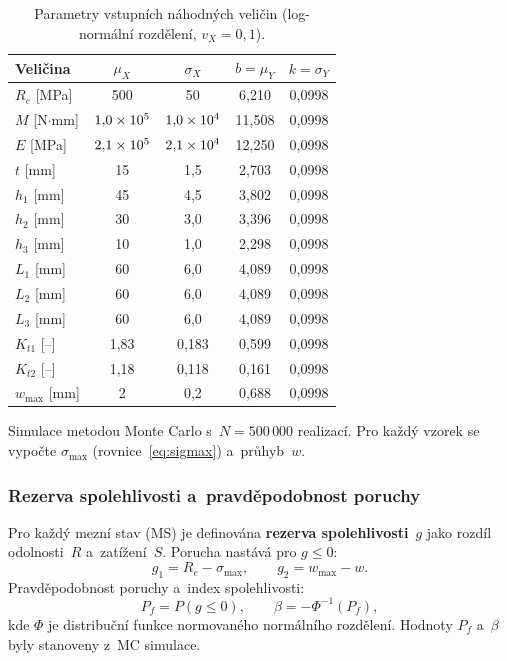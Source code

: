 \begin{table}[H]
\centering
\caption{Parametry vstupních náhodných veličin (log-normální rozdělení, $v_X = 0{,}1$).}
\begin{tabular}{lcccc}
\toprule
\textbf{Veličina} & $\mu_X$ & $\sigma_X$ & $b = \mu_Y$ & $k = \sigma_Y$ \\
\midrule
$R_e$ [MPa]    & 500       & 50      & 6{,}210  & 0{,}0998 \\
$M$ [N$\cdot$mm] & $1{,}0\times 10^{5}$ & $1{,}0\times 10^{4}$ & 11{,}508 & 0{,}0998 \\
$E$ [MPa]      & $2{,}1\times 10^{5}$ & $2{,}1\times 10^{4}$ & 12{,}250 & 0{,}0998 \\
$t$ [mm]       & 15        & 1{,}5   & 2{,}703  & 0{,}0998 \\
$h_1$ [mm]     & 45        & 4{,}5   & 3{,}802  & 0{,}0998 \\
$h_2$ [mm]     & 30        & 3{,}0   & 3{,}396  & 0{,}0998 \\
$h_3$ [mm]     & 10        & 1{,}0   & 2{,}298  & 0{,}0998 \\
$L_1$ [mm]     & 60        & 6{,}0   & 4{,}089  & 0{,}0998 \\
$L_2$ [mm]     & 60        & 6{,}0   & 4{,}089  & 0{,}0998 \\
$L_3$ [mm]     & 60        & 6{,}0   & 4{,}089  & 0{,}0998 \\
$K_{t1}$ [--]  & 1{,}83    & 0{,}183 & 0{,}599  & 0{,}0998 \\
$K_{t2}$ [--]  & 1{,}18    & 0{,}118 & 0{,}161  & 0{,}0998 \\
$w_{\max}$ [mm] & 2        & 0{,}2   & 0{,}688  & 0{,}0998 \\
\bottomrule
\end{tabular}
\end{table}

Simulace metodou Monte Carlo s~$N = 500\,000$ realizací. Pro každý vzorek se vypočte $\sigma_{\max}$ (rovnice~\eqref{eq:sigmax}) a~průhyb~$w$.

\subsubsection{Rezerva spolehlivosti a~pravděpodobnost poruchy}

Pro každý mezní stav (MS) je definována \textbf{rezerva spolehlivosti}~$g$ jako rozdíl odolnosti~$R$ a~zatížení~$S$. Porucha nastává pro $g \le 0$:
\begin{equation}
    g_1 = R_e - \sigma_{\max}, \qquad g_2 = w_{\max} - w.
\end{equation}
Pravděpodobnost poruchy a~index spolehlivosti:
\begin{equation}
    P_f = P(g \le 0), \qquad \beta = -\Phi^{-1}(P_f),
\end{equation}
kde $\Phi$ je distribuční funkce normovaného normálního rozdělení. Hodnoty $P_f$ a~$\beta$ byly stanoveny z~MC simulace.

